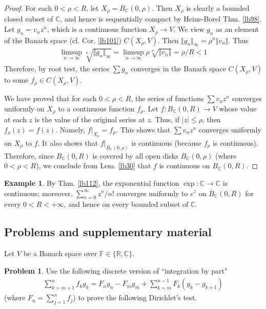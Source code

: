 \documentclass[12pt,b5paper,notitlepage]{article}
\theoremstyle{definition}
\newtheorem{eg}[df]{Example}
\newtheorem{prob}{\color{red}Problem}[section]
\theoremstyle{plain}
\newcommand{\ovl}{\overline}
\newcommand{\Cbb}{\mathbb C}
\newcommand{\Rbb}{\mathbb R}
\newcommand{\Fbb}{\mathbb F}
\numberwithin{equation}{section}
\begin{document}
\begin{proof}
For each $0<\rho<R$, let $X_\rho=\ovl B_\Cbb(0,\rho)$. Then $X_\rho$ is clearly a bounded closed subset of $\Cbb$, and hence is sequentially compact by Heine-Borel Thm. \ref{lb98}. Let $g_n=v_nz^n$, which is a continuous function $X_\rho\rightarrow V$. We view $g_n$ as an element of the Banach space (cf. Cor. \ref{lb101}) $C(X_\rho,V)$. Then $\Vert g_n\Vert_\infty=\rho^n\Vert v_n\Vert$. Thus
\begin{align*}
\limsup_{n\rightarrow\infty}\sqrt[n]{\Vert g_n\Vert_\infty}=\limsup_{n\rightarrow\infty}\rho\sqrt[n]{\Vert v_n\Vert}=\rho/R<1
\end{align*}
Therefore, by root test, the series $\sum g_n$ converges in the Banach space $C(X_\rho,V)$ to some $f_\rho\in C(X_\rho,V)$.

We have proved that for each $0<\rho<R$, the series of functions $\sum v_nz^n$ converges uniformly on $X_\rho$ to a continuous function $f_\rho$. Let $f:B_\Cbb(0,R)\rightarrow V$ whose value at each $z$ is the value of the original series at $z$. Thus, if $|z|\leq\rho$, then $f_\rho(z)=f(z)$. Namely, $f|_{X_\rho}=f_\rho$. This shows that $\sum v_nz^n$ converges uniformly on $X_\rho$ to $f$. It also shows that $f|_{B_\Cbb(0,\rho)}$ is continuous (because $f_\rho$ is continuous). Therefore, since $B_\Cbb(0,R)$ is covered by all open disks $B_\Cbb(0,\rho)$ (where $0<\rho<R$), we conclude from Lem. \ref{lb30} that $f$ is continuous on $B_\Cbb(0,R)$.
\end{proof}

\begin{eg}\label{lb214}
By Thm. \ref{lb112}, the exponential function $\exp:\Cbb\rightarrow\Cbb$ is continuous; moreover, $\sum_{n=0}^\infty z^n/n!$ converges uniformly to $e^z$ on $\ovl B_{\Cbb}(0,R)$ for every $0<R<+\infty$, and hence on every bounded subset of $\Cbb$.
\end{eg}



\subsection{Problems and supplementary material}


Let $V$ be a Banach space over $\Fbb\in\{\Rbb,\Cbb\}$. 

\begin{prob}
Use the following discrete version of ``integration by part" 
\begin{align}
\sum_{k=m+1}^n f_kg_k=F_ng_n-F_mg_m+\sum_{k=m}^{n-1}F_k (g_k-g_{k+1})
\end{align}
(where $F_n=\sum_{j=1}^n f_j$) to prove the following Dirichlet's test.
\end{prob}
\end{document}
